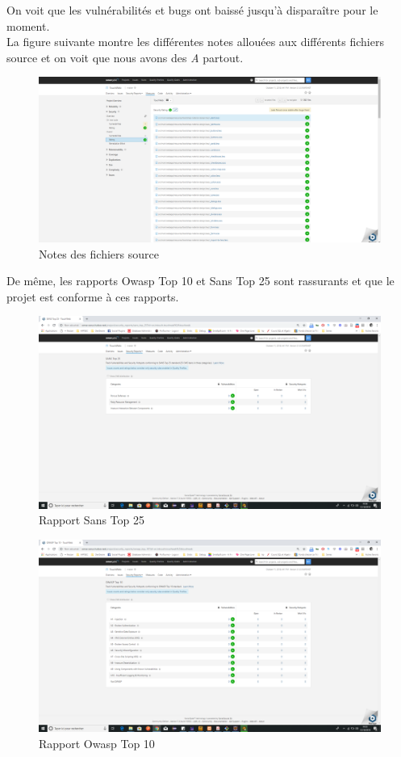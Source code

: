 On voit que les vulnérabilités et bugs ont baissé jusqu'à disparaître pour le moment.\\
La figure suivante montre les différentes notes allouées aux différents fichiers source et on voit que nous avons des \textit{A} partout.
\begin{figure}[H]
	\centering
	\begin{minipage}{12cm}
		\centering
		\includegraphics[width=1\textwidth]{fig/security_rating.png}
	\end{minipage}
	\caption{Notes des fichiers source}
	\label{fig:sfds}
\end{figure}
De même, les rapports Owasp Top 10 et Sans Top 25 sont rassurants et que le projet est conforme à ces rapports.
\begin{figure}[H]
	\centering
	\begin{minipage}{12cm}
		\centering
		\includegraphics[width=1\textwidth]{fig/Sans_top_25.png}
	\end{minipage}
	\caption{Rapport Sans Top 25}
	\label{fig:sfds}
\end{figure}
\begin{figure}[H]
	\centering
	\begin{minipage}{12cm}
		\centering
		\includegraphics[width=1\textwidth]{fig/owasp_report.png}
	\end{minipage}
	\caption{Rapport Owasp Top 10}
	\label{fig:sfds}
\end{figure}